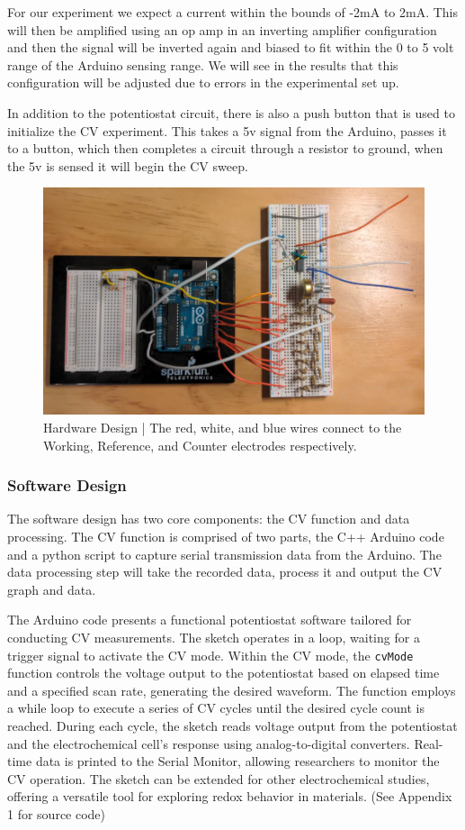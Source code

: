 \documentclass{article}
\begin{document}
For our experiment we expect a current within the bounds of -2mA to 2mA. This will then be amplified using an op amp in an inverting amplifier configuration and then the signal will be inverted again and biased to fit within the 0 to 5 volt range of the Arduino sensing range. We will see in the results that this configuration will be adjusted due to errors in the experimental set up.

In addition to the potentiostat circuit, there is also a push button that is used to initialize the CV experiment. This takes a 5v signal from the Arduino, passes it to a button, which then completes a circuit through a resistor to ground, when the 5v is sensed it will begin the CV sweep.

\begin{figure}[H]
  \centering
  \includegraphics[width=.9\linewidth]{hardware_design.png}
  \caption{Hardware Design | The red, white, and blue wires connect to the Working, Reference, and Counter electrodes respectively.}
\end{figure}

\subsubsection*{Software Design}

The software design has two core components: the CV function and data processing. The CV function is comprised of two parts, the C++ Arduino code and a python script to capture serial transmission data from the Arduino. The data processing step will take the recorded data, process it and output the CV graph and data.

The Arduino code presents a functional potentiostat software tailored for conducting CV measurements. The sketch operates in a loop, waiting for a trigger signal to activate the CV mode. Within the CV mode, the \texttt{cvMode} function controls the voltage output to the potentiostat based on elapsed time and a specified scan rate, generating the desired waveform. The function employs a while loop to execute a series of CV cycles until the desired cycle count is reached. During each cycle, the sketch reads voltage output from the potentiostat and the electrochemical cell's response using analog-to-digital converters. Real-time data is printed to the Serial Monitor, allowing researchers to monitor the CV operation. The sketch can be extended for other electrochemical studies, offering a versatile tool for exploring redox behavior in materials. (See Appendix 1 for source code)
\end{document}
